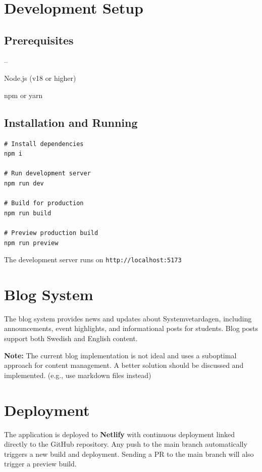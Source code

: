 \documentclass[a4paper,10pt,oneside]{article}
\begin{document}
\section{Development Setup}

\subsection{Prerequisites}
\begin{list}{--}{}
\item Node.js (v18 or higher)
\item npm or yarn
\end{list}

\subsection{Installation and Running}

\begin{verbatim}
# Install dependencies
npm i

# Run development server
npm run dev

# Build for production
npm run build

# Preview production build
npm run preview
\end{verbatim}

The development server runs on \texttt{http://localhost:5173}

\section{Blog System}

The blog system provides news and updates about Systemvetardagen, including announcements, event highlights, and informational posts for students. Blog posts support both Swedish and English content.

\textbf{Note:} The current blog implementation is not ideal and uses a suboptimal approach for content management. A better solution should be discussed and implemented. (e.g., use markdown files instead)

\section{Deployment}

The application is deployed to \textbf{Netlify} with continuous deployment linked directly to the GitHub repository. Any push to the main branch automatically triggers a new build and deployment. Sending a PR to the main branch will also trigger a preview build.
\end{document}
